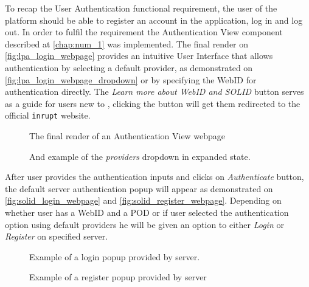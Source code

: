 To recap the User Authentication functional requirement, the user of the platform should be able to register an account in the application, log in and log out. In order to fulfil the requirement the Authentication View component described at \autoref{chap:num_1} was implemented. The final render on \autoref{fig:lpa_login_webpage} provides an intuitive User Interface that allows authentication by selecting a default \solid{} provider, as demonstrated on \autoref{fig:lpa_login_webpage_dropdown} or by specifying the WebID for authentication directly. The \textit{Learn more about WebID and SOLID} button serves as a guide for users new to \solid{}, clicking the button will get them redirected to the official \texttt{inrupt} website. 

\begin{figure}[hbt]
  \caption{The final render of an Authentication View webpage}
  \label{fig:lpa_login_webpage}
\endminipage\hfill
{}
  \caption{And example of the \textit{providers} dropdown in expanded state.}
  \label{fig:lpa_login_webpage_dropdown}
\endminipage\hfill
\end{figure}

After user provides the authentication inputs and clicks on \textit{Authenticate} button, the default \solid{} server authentication popup will appear as demonstrated on \autoref{fig:solid_login_webpage} and \autoref{fig:solid_register_webpage}. Depending on whether user has a WebID and a \solid{} POD or if user selected the authentication option using default providers he will be given an option to either \textit{Login} or \textit{Register} on specified \solid{} server. 

\begin{figure}[hbt]
  \caption{Example of a login popup provided by \solid{} server.}
  \label{fig:solid_login_webpage}
\endminipage\hfill
{}
  \caption{Example of a register popup provided by \solid{} server}
  \label{fig:solid_register_webpage}
\endminipage\hfill
\end{figure}


